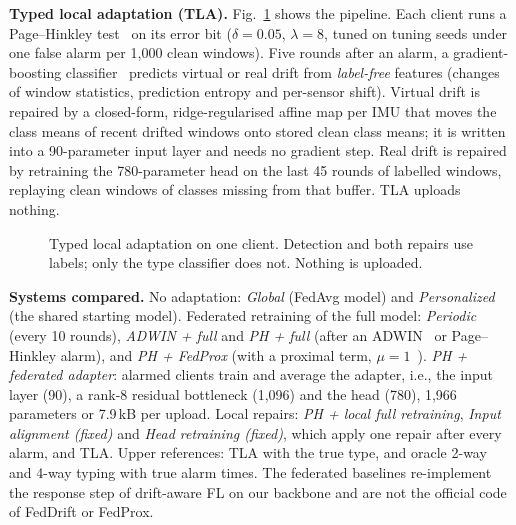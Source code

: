 \documentclass[conference]{IEEEtran}
\newcommand{\tla}{TLA}
\begin{document}
\textbf{Typed local adaptation (\tla{}).} Fig.~\ref{fig:system} shows the pipeline. Each client runs a Page--Hinkley test~\cite{page1954} on its error bit ($\delta=0.05$, $\lambda=8$, tuned on tuning seeds under one false alarm per 1{,}000 clean windows). Five rounds after an alarm, a gradient-boosting classifier~\cite{friedman2001gbm} predicts virtual or real drift from \emph{label-free} features (changes of window statistics, prediction entropy and per-sensor shift). Virtual drift is repaired by a closed-form, ridge-regularised affine map per IMU that moves the class means of recent drifted windows onto stored clean class means; it is written into a 90-parameter input layer and needs no gradient step. Real drift is repaired by retraining the 780-parameter head on the last 45 rounds of labelled windows, replaying clean windows of classes missing from that buffer. \tla{} uploads nothing.

\begin{figure}[t]
\centering
{}
\caption{Typed local adaptation on one client. Detection and both repairs use labels; only the type classifier does not. Nothing is uploaded.}
\label{fig:system}
\end{figure}

\textbf{Systems compared.} No adaptation: \emph{Global} (FedAvg model) and \emph{Personalized} (the shared starting model). Federated retraining of the full model: \emph{Periodic} (every 10 rounds), \emph{ADWIN + full} and \emph{PH + full} (after an ADWIN~\cite{bifet2007adwin} or Page--Hinkley alarm), and \emph{PH + FedProx} (with a proximal term, $\mu=1$~\cite{li2020fedprox}). \emph{PH + federated adapter}: alarmed clients train and average the adapter, i.e., the input layer (90), a rank-8 residual bottleneck (1{,}096) and the head (780), 1{,}966 parameters or 7.9\,kB per upload. Local repairs: \emph{PH + local full retraining}, \emph{Input alignment (fixed)} and \emph{Head retraining (fixed)}, which apply one repair after every alarm, and \tla{}. Upper references: \tla{} with the true type, and oracle 2-way and 4-way typing with true alarm times. The federated baselines re-implement the response step of drift-aware FL on our backbone and are not the official code of FedDrift or FedProx.
\end{document}
